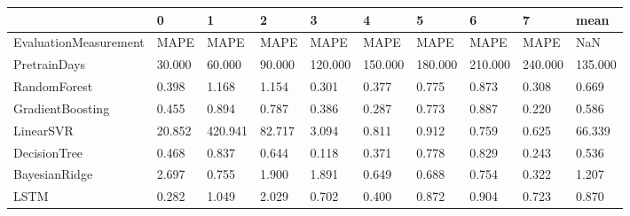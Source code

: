 \begin{tabular}{llllllllll}
\toprule
{} &      0 &       1 &      2 &       3 &       4 &       5 &       6 &       7 &    mean \\
\midrule
EvaluationMeasurement &   MAPE &    MAPE &   MAPE &    MAPE &    MAPE &    MAPE &    MAPE &    MAPE &     NaN \\
PretrainDays          & 30.000 &  60.000 & 90.000 & 120.000 & 150.000 & 180.000 & 210.000 & 240.000 & 135.000 \\
RandomForest          &  0.398 &   1.168 &  1.154 &   0.301 &   0.377 &   0.775 &   0.873 &   0.308 &   0.669 \\
GradientBoosting      &  0.455 &   0.894 &  0.787 &   0.386 &   0.287 &   0.773 &   0.887 &   0.220 &   0.586 \\
LinearSVR             & 20.852 & 420.941 & 82.717 &   3.094 &   0.811 &   0.912 &   0.759 &   0.625 &  66.339 \\
DecisionTree          &  0.468 &   0.837 &  0.644 &   0.118 &   0.371 &   0.778 &   0.829 &   0.243 &   0.536 \\
BayesianRidge         &  2.697 &   0.755 &  1.900 &   1.891 &   0.649 &   0.688 &   0.754 &   0.322 &   1.207 \\
LSTM                  &  0.282 &   1.049 &  2.029 &   0.702 &   0.400 &   0.872 &   0.904 &   0.723 &   0.870 \\
\bottomrule
\end{tabular}
